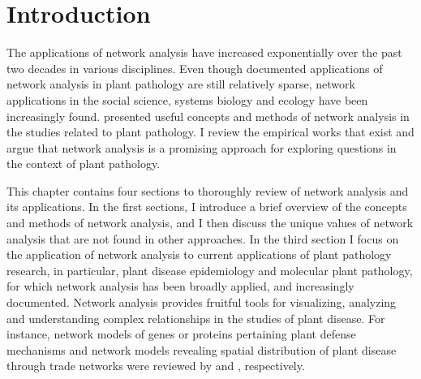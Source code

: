 \section*{Introduction}
\label{ch:intro}

The applications of network analysis have increased exponentially over the past two decades in various disciplines. Even though documented applications of network analysis in plant pathology are still relatively sparse, network applications in the social science, systems biology and ecology have been increasingly found.  presented useful concepts and methods of network analysis in the studies related to plant pathology. I review the empirical works that exist and argue that network analysis is a promising approach for exploring questions in the context of plant pathology.

This chapter contains four sections to thoroughly review of network analysis and its applications. In the first sections, I introduce a brief overview of the concepts and methods of network analysis, and I then discuss the unique values of network analysis that are not found in other approaches. In the third section I focus on the application of network analysis to current applications of plant pathology research, in particular, plant disease epidemiology and molecular plant pathology, for which network analysis has been broadly applied, and increasingly documented. Network analysis provides fruitful tools for visualizing, analyzing and understanding complex relationships in the studies of plant disease. For instance, network models of genes or proteins pertaining plant defense mechanisms and network models revealing spatial distribution of plant disease through trade networks were reviewed by  and , respectively.

